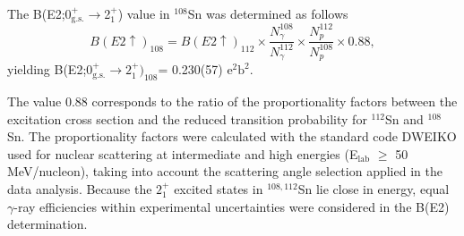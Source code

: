 \documentclass[prc,twocolumn,amssymb,amsmath,showpacs,superscriptaddress]{revtex4}
\begin{document}
The B(E2;0$^+_{\text{g.s.}}$$\to$2$^+_1$) value in
$^{108}$Sn was determined as follows
\begin{displaymath}
B(E2\uparrow)_{\text{108}} = B(E2\uparrow)_{\text{112}} \times
\frac{N^{\text{108}}_{\gamma}}{N^{\text{112}}_{\gamma}} \times
\frac{N^{\text{112}}_p}{N^{\text{108}}_p} \times 0.88,
\end{displaymath}
yielding B(E2;$0^+_{\text{g.s.}}\to2^+_1)_{\text{108}} $=
0.230(57) $\text{e}^{2}\text{b}^{2}$.

The value $0.88$ corresponds to the ratio of the proportionality
factors between the excitation cross section and the reduced
transition probability for $^{112}$Sn and $^{108}$Sn. The
proportionality factors were calculated with the standard code
DWEIKO \cite{ber03} used for nuclear scattering at intermediate
and high energies (E$_{\text{lab}}$ $\geqslant$ 50 MeV/nucleon),
taking into account the scattering angle selection applied in the
data analysis. Because the $2^{+}_{1}$ excited states in
$^{108,112}$Sn lie close in energy, equal $\gamma$-ray
efficiencies within experimental uncertainties were considered in
the B(E2) determination.
\end{document}
